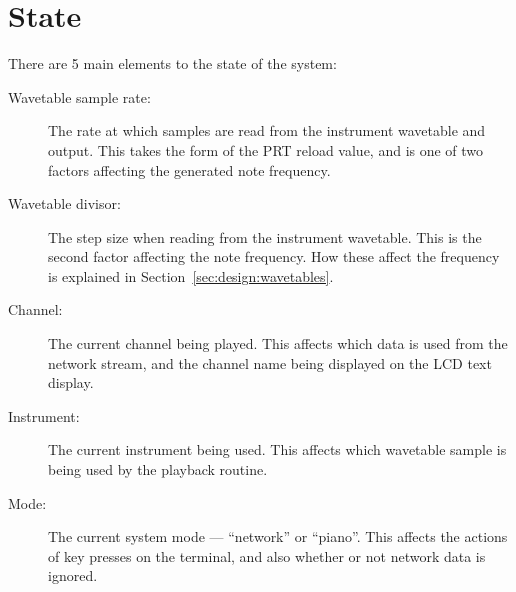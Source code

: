 \section{State}
\label{sec:overview:state}

There are 5 main elements to the state of the system:

\begin{description}
\item[Wavetable sample rate:] The rate at which samples are read from the instrument wavetable and 
output.  This takes the form of the PRT reload value, and is one of two factors affecting the 
generated note frequency.
\item[Wavetable divisor:] The step size when reading from the instrument wavetable.  This is the 
second factor affecting the note frequency.  How these affect the frequency is explained in 
Section~\ref{sec:design:wavetables}.
\item[Channel:] The current channel being played.  This affects which data is used from the network 
stream, and the channel name being displayed on the LCD text display.
\item[Instrument:] The current instrument being used.  This affects which wavetable sample is being 
used by the playback routine.
\item[Mode:] The current system mode --- ``network'' or ``piano''.  This affects the actions of key 
presses on the terminal, and also whether or not network data is ignored.
\end{description}
